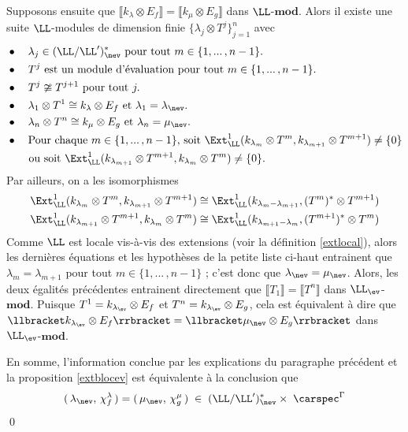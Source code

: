 \begin{Thm}
\begin{pre}
Supposons ensuite que $\llbracket k_\lambda \otimes E_f \rrbracket = \llbracket k_\mu \otimes E_g \rrbracket$ dans $\LL$-$\mathbf{mod}$. Alors il existe une suite $\LL$-modules de dimension finie $\{\lambda_j \otimes T^j\}_{j=1}^n$ avec 
\begin{align*}
&\bullet \quad \lambda_j \in (\LL/\LL')_{\nev}^* \text{ pour tout } m \in \{1,...\,,n-1\}.\\
&\bullet \quad T^j \text{ est un module d'évaluation pour tout } m \in \{1,...\,,n-1\}.\\
&\bullet \quad T^j \ncong T^{j+1} \text{ pour tout } j.\\
&\bullet \quad \lambda_1 \otimes T^1 \cong k_{\lambda} \otimes E_f \text{ et } \lambda_1 = \lambda_{\nev}.\\
&\bullet \quad \lambda_n \otimes T^n \cong k_{\mu} \otimes E_g \text{ et } \lambda_n = \mu_{\nev}.\\
&\bullet \quad \text{Pour chaque } m \in \{1,...\,,n-1\} \text{, soit } \Ext^1_\LL(k_{\lambda_m} \otimes T^m,k_{\lambda_{m+1}} \otimes T^{m+1}) \neq \{0\}\\
& \quad \,\,\,\, \text{ ou soit } \Ext^1_\LL(k_{\lambda_{m+1}} \otimes T^{m+1}, k_{\lambda_m} \otimes T^m) \neq \{0\}.
\end{align*}
Par ailleurs, on a les isomorphismes
\begin{align*}
\Ext^1_\LL(k_{\lambda_m} \otimes T^m,k_{\lambda_{m+1}} \otimes T^{m+1}) &\cong \Ext^1_\LL(k_{\lambda_m - \lambda_{m+1}}, (T^m)^* \otimes T^{m+1})\\
\Ext^1_\LL(k_{\lambda_{m+1}} \otimes T^{m+1},k_{\lambda_m} \otimes T^m) &\cong \Ext^1_\LL(k_{\lambda_{m+1} - \lambda_m}, (T^{m+1})^* \otimes T^m)
\end{align*}
Comme $\LL$ est locale vis-à-vis des extensions (voir la définition \ref{extlocal}), alors les dernières équations et les hypothèses de la petite liste ci-haut entrainent que $\lambda_m = \lambda_{m+1}$ pour tout $m \in \{1,...\,,n-1\}$ ; c'est donc que $\lambda_{\nev} = \mu_{\nev}$. Alors, les deux égalités précédentes entrainent directement que $\llbracket T_1 \rrbracket = \llbracket T^n \rrbracket$ dans $\LL_{\ev}$-$\mathbf{mod}$. Puisque $T^1 = k_{\lambda_{\ev}} \otimes E_f$ et $T^n = k_{\lambda_{\ev}} \otimes E_g$, cela est équivalent à dire que $ \llbracket k_{\lambda_{\ev}} \otimes E_f \rrbracket = \llbracket \mu_{\nev} \otimes E_g \rrbracket$ dans $\LL_{\ev}$-$\mathbf{mod}$.

En somme, l'information conclue par les explications du paragraphe précédent et la proposition \ref{extblocev} est équivalente à la conclusion que 
$$ (\,\lambda_{\nev},\,\chi_f^\lambda\,) = (\,\mu_{\nev},\,\chi_g^\mu\,) \;\in\; (\LL/\LL')_{\nev}^* \times \; \carspec^\Gamma $$
\vspace{-2em}
\qed
\end{pre}
\end{Thm}

